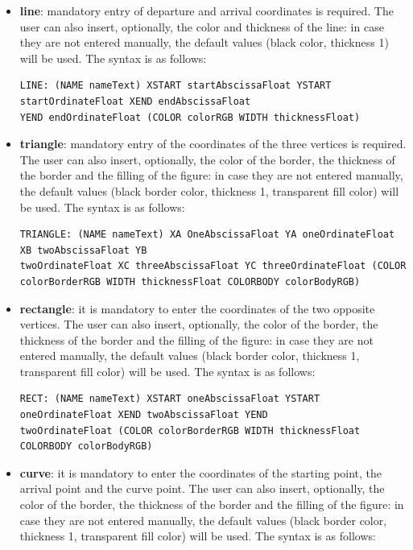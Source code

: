 \documentclass[a4paper]{article}
\begin{document}
\begin{itemize}
\item \textbf{line}: mandatory entry of departure and arrival coordinates is required. The user can also insert, optionally, the color and thickness of the line: in case they are not entered manually, the default values (black color, thickness 1) will be used. The syntax is as follows:
\vspace{1\baselineskip}
\begin{verbatim}
LINE: (NAME nameText) XSTART startAbscissaFloat YSTART startOrdinateFloat XEND endAbscissaFloat 
YEND endOrdinateFloat (COLOR colorRGB WIDTH thicknessFloat)
\end{verbatim}
\vspace{1\baselineskip}
\item \textbf{triangle}: mandatory entry of the coordinates of the three vertices is required. The user can also insert, optionally, the color of the border, the thickness of the border and the filling of the figure: in case they are not entered manually, the default values (black border color, thickness 1, transparent fill color) will be used. The syntax is as follows:
\vspace{1\baselineskip}
\begin{verbatim}
TRIANGLE: (NAME nameText) XA OneAbscissaFloat YA oneOrdinateFloat XB twoAbscissaFloat YB 
twoOrdinateFloat XC threeAbscissaFloat YC threeOrdinateFloat (COLOR
colorBorderRGB WIDTH thicknessFloat COLORBODY colorBodyRGB)
\end{verbatim}
\vspace{1\baselineskip}
\item \textbf{rectangle}: it is mandatory to enter the coordinates of the two opposite vertices. The user can also insert, optionally, the color of the border, the thickness of the border and the filling of the figure: in case they are not entered manually, the default values (black border color, thickness 1, transparent fill color) will be used. The syntax is as follows:
\vspace{1\baselineskip}
\begin{verbatim}
RECT: (NAME nameText) XSTART oneAbscissaFloat YSTART oneOrdinateFloat XEND twoAbscissaFloat YEND 
twoOrdinateFloat (COLOR colorBorderRGB WIDTH thicknessFloat COLORBODY colorBodyRGB)
\end{verbatim}
\vspace{1\baselineskip}
\item \textbf{curve}: 
it is mandatory to enter the coordinates of the starting point, the arrival point and the curve point. The user can also insert, optionally, the color of the border, the thickness of the border and the filling of the figure: in case they are not entered manually, the default values (black border color, thickness 1, transparent fill color) will be used. The syntax is as follows:

\end{itemize}
\end{document}
